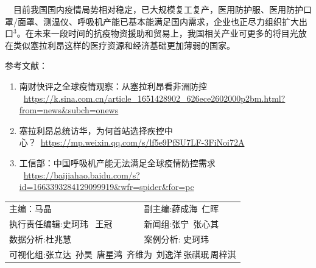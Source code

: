 \documentclass[]{article}
\begin{document}
\(\quad\)目前我国国内疫情局势相对稳定，已大规模复工复产，医用防护服、医用防护口罩/面罩、测温仪、呼吸机产能已基本能满足国内需求，企业也正尽力组织扩大出口\(^3\)。在未来一段时间的抗疫物资援助和贸易上，我国相关产业可更多的将目光放在类似塞拉利昂这样的医疗资源和经济基础更加薄弱的国家。

\small 参考文献：

\begin{enumerate}
\def\labelenumi{\arabic{enumi}.}
\item
  南财快评之全球疫情观察：从塞拉利昂看非洲防控
  ~\url{https://k.sina.com.cn/article_1651428902_626ece2602000p2bm.html?from=news\&subch=onews}
\item
  塞拉利昂总统访华，为何首站选择疾控中心？~\url{https://mp.weixin.qq.com/s/lf5e9PfSU7LF-3FiNoi72A}
\item
  工信部：中国呼吸机产能无法满足全球疫情防控需求
  ~\url{https://baijiahao.baidu.com/s?id=1663393284129099919\&wfr=spider\&for=pc}
\end{enumerate}

\centering
\small
\begin{tabular}{ll}

主编：马晶  &  副主编:薛成海\,  仁晖  \\
执行责任编辑:史珂玮 \, 王冠  & 新闻组:张宁\, 张心其 \\
数据分析:杜兆慧  &  案例分析: 史珂玮\\
\multicolumn{2}{l}{可视化组:张立达\, 孙昊\, 唐星鸿\, 齐维为\, 刘逸洋\,张祺珉\,周梓淇}

\end{tabular}
\end{document}
